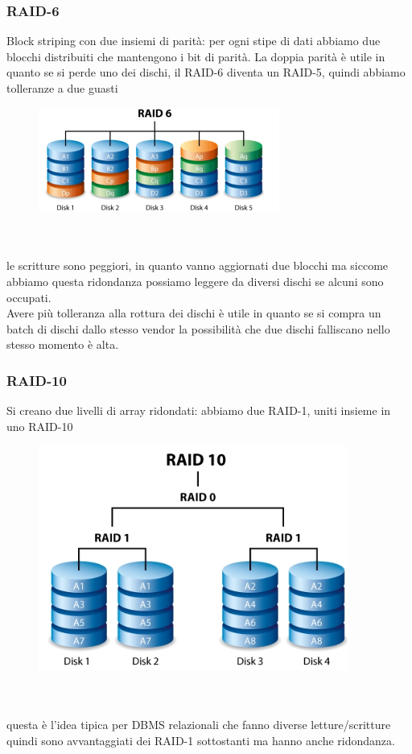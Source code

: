 \documentclass[12pt, oneside]{extbook} %
\begin{document}
\subsubsection{RAID-6}
Block striping con due insiemi di parità: per ogni stipe di dati abbiamo due blocchi distribuiti che mantengono i bit di parità. La doppia parità è utile in quanto se si perde uno dei dischi, il RAID-6 diventa un RAID-5, quindi abbiamo tolleranze a due guasti\\
\begin{figure}[!h]
	\includegraphics[scale=0.4]{immagini/raid6.png}
\end{figure}\\\\
le scritture sono peggiori, in quanto vanno aggiornati due blocchi ma siccome abbiamo questa ridondanza possiamo leggere da diversi dischi se alcuni sono occupati.\\Avere più tolleranza alla rottura dei dischi è utile in quanto se si compra un batch di dischi dallo stesso vendor la possibilità che due dischi falliscano nello stesso momento è alta.
\subsubsection{RAID-10}
Si creano due livelli di array ridondati: abbiamo due RAID-1, uniti insieme in uno RAID-10\\
\begin{figure}[!h]
	\includegraphics[scale=0.4]{immagini/raid10.png}
\end{figure}\\\\
questa è l'idea tipica per DBMS relazionali che fanno diverse letture/scritture quindi sono avvantaggiati dei RAID-1 sottostanti ma hanno anche ridondanza.
\end{document}
